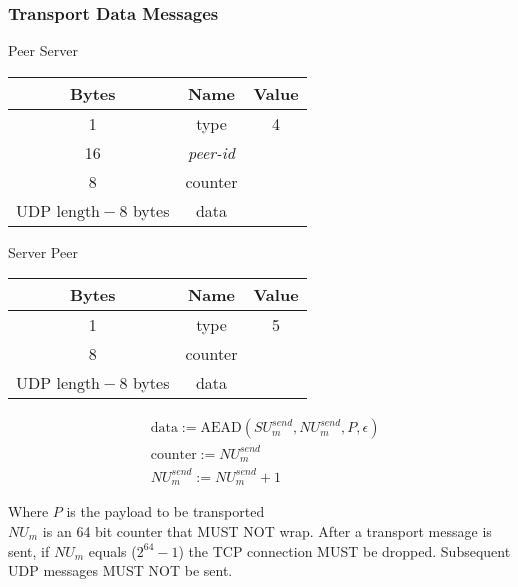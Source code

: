 \subsubsection{Transport Data Messages}

\begin{center}
    Peer \textrightarrow Server\\
    \begin{tabular}{|c|c|c|}
        \hline
        \textbf{Bytes}                & \textbf{Name}  & \textbf{Value} \\
        \hline
        1                             & type           & 4              \\
        \hline
        16                            & \emph{peer-id} &                \\
        \hline
        8                             & counter        &                \\
        \hline
        $\text{UDP length} - 8$ bytes & data           &                \\
        \hline
    \end{tabular}
\end{center}

\begin{center}
    Server \textrightarrow Peer\\
    \begin{tabular}{|c|c|c|}
        \hline
        \textbf{Bytes}                & \textbf{Name} & \textbf{Value} \\
        \hline
        1                             & type          & 5              \\
        \hline
        8                             & counter       &                \\
        \hline
        $\text{UDP length} - 8$ bytes & data          &                \\
        \hline
    \end{tabular}
\end{center}


\begin{align*}
    & \text{data} := \text{AEAD}(\mathit{SU}_{m}^{send}, \mathit{NU}_{m}^{send}, P, \epsilon)\\
    & \text{counter} := \mathit{NU}_{m}^{send}\\
    & \mathit{NU}_{m}^{send} := \mathit{NU}_{m}^{send} + 1
\end{align*}


Where $P$ is the payload to be transported\\

$\mathit{NU}_{m}$ is an 64 bit counter that MUST NOT wrap. After a transport message is sent, if $\mathit{NU}_{m}$ equals
($2^{64}-1$) the TCP connection MUST be dropped. Subsequent UDP messages MUST NOT be sent. \\


